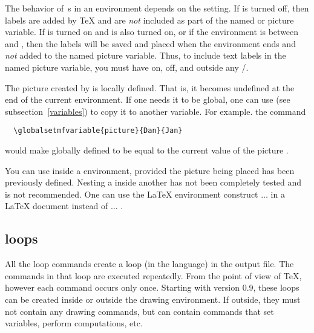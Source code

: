 \documentclass[letterpaper]{article}
\begin{document}
The behavior of \,s in an  environment depends
on the setting.  If  is turned off, then labels are added
by \TeX{} and are \emph{not} included as part of the named \MF{} or
\MP{} picture variable. If  is turned on and
 is also turned on, or if the 
environment is between  and , then
the labels will be saved and placed when the  environment
ends and \emph{not} added to the named picture variable. Thus, to
include text labels in the named picture variable, you must have
 on,  off, and  outside
any \slash{}.

The picture created by  is locally defined. That is, it
becomes undefined at the end of the current  environment. If
one needs it to be global, one can use  (see
subsection~\ref{variables}) to copy it to another variable. For example.
the command
\begin{verbatim}
  \globalsetmfvariable{picture}{Dan}{Jan}
\end{verbatim}
would make  globally defined to be equal to the current value
of the picture .

You can use  inside a  environment,
provided the picture being placed has been previously defined. Nesting a
 inside another has not been completely tested and is not
recommended. One can use the \LaTeX{} environment construct
 $\ldots$  in a LaTeX
document instead of  $\ldots$ .

\subsection{\CMF{} loops}\label{loops}

All the \mfp{} loop commands create a loop (in the \MF{} language) in
the output file. The \MF{} commands in that loop are executed repeatedly.
From the point of view of \TeX{}, however each command occurs only once.
Starting with version 0.9, these loops can be created inside or outside
the  drawing environment. If outside, they must not contain
any drawing commands, but can contain commands that set variables,
perform computations, etc.

\begin{cd}
\\
 \ \\
%
%
\end{cd}
\end{document}
